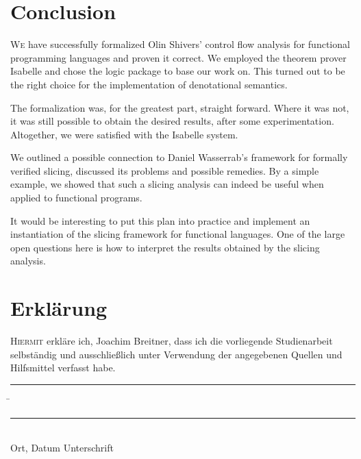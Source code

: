 \documentclass[a4paper,parskip=half,BCOR=8mm,DIV=calc,12pt]{scrbook}
\begin{document}
\chapter{Conclusion}

\lettrine[lines=3]We have successfully formalized Olin Shivers’ control flow analysis for functional programming languages and proven it correct. We employed the theorem prover Isabelle and chose the logic package  to base our work on. This turned out to be the right choice for the implementation of denotational semantics. 

The formalization was, for the greatest part, straight forward. Where it was not, it was still possible to obtain the desired results, after some experimentation. Altogether, we were satisfied with the Isabelle system.

We outlined a possible connection to Daniel Wasserrab’s framework for formally verified slicing, discussed its problems and possible remedies. By a simple example, we showed that such a slicing analysis can indeed be useful when applied to functional programs.

It would be interesting to put this plan into practice and implement an instantiation of the slicing framework for functional languages. One of the large open questions here is how to interpret the results obtained by the slicing analysis.

\appendix

{
\raggedright
\renewcommand{\bibfont}{\setlength{\parskip}{-11pt}}

}

\renewcommand{\cleardoublepage}{\clearpage}
\chapter*{Erklärung}

\lettrine H{iermit} erkläre ich, Joachim Breitner, dass ich die vorliegende Studienarbeit selb\-ständig
und ausschließlich unter Verwendung der angegebenen Quellen und Hilfsmittel verfasst
habe.
\vspace{20mm}
\begin{tabbing}
\rule{4cm}{.4pt}\hspace{1cm} \= \rule{7cm}{.4pt} \\
Ort, Datum \> Unterschrift
\end{tabbing}
\end{document}
